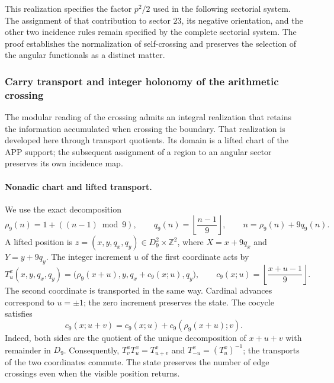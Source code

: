 This realization specifies the factor $p^2/2$ used in the following
sectorial system. The assignment of that contribution to sector $23$,
its negative orientation, and the other two incidence rules remain
specified by the complete sectorial system. The proof establishes the
normalization of self-crossing and preserves the selection of the
angular functionals as a distinct matter.




\subsubsection{Carry transport and integer holonomy of the arithmetic crossing}
\label{ii:subsec:transporte-entero-cruce}

The modular reading of the crossing admits an integral realization that retains the information accumulated when crossing the boundary. That realization is developed here through transport quotients. Its domain is a lifted chart of the APP support; the subsequent assignment of a region to an angular sector preserves its own incidence map.

\paragraph{Nonadic chart and lifted transport.}
We use the exact decomposition
\[
 \rho_9(n)=1+((n-1)\bmod9),\qquad
 q_9(n)=\left\lfloor\frac{n-1}{9}\right\rfloor,
 \qquad n=\rho_9(n)+9q_9(n).
\]
A lifted position is
$z=(x,y,q_x,q_y)\in D_9^2\times\mathbb Z^2$, where
$X=x+9q_x$ and $Y=y+9q_y$. The integer increment $u$ of the first
coordinate acts by
\[
 T^x_u(x,y,q_x,q_y)=
 \bigl(\rho_9(x+u),y,q_x+c_9(x;u),q_y\bigr),\qquad
 c_9(x;u)=\left\lfloor\frac{x+u-1}{9}\right\rfloor.
\]
The second coordinate is transported in the same way. Cardinal
advances correspond to $u=\pm1$; the zero increment preserves the state.
The cocycle satisfies
\[
 c_9(x;u+v)=c_9(x;u)+c_9(\rho_9(x+u);v).
\]
Indeed, both sides are the quotient of the unique decomposition of
$x+u+v$ with remainder in $D_9$. Consequently,
$T^x_vT^x_u=T^x_{u+v}$ and $T^x_{-u}=(T^x_u)^{-1}$; the transports
of the two coordinates commute. The state preserves the number of edge
crossings even when the visible position returns.


